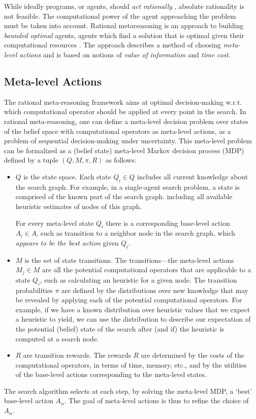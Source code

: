 While ideally programs, or agents, should {\em act rationally}
\cite{Russell.aima}, absolute rationality is not feasible. The
computational power of the agent approaching the problem must be taken
into account. Rational metareasoning \cite{Russell.right} is an
approach to building {\em bounded optimal} agents, agents which find a
solution that is optimal given their computational resources
\cite{Horvitz.reasoningabout}. The approach describes a method of
choosing {\em meta-level actions} and is based on notions of {\em
value of information} and {\em time cost}.

\subsection{Meta-level Actions}

The rational meta-reasoning framework aims at optimal
decision-making w.r.t. which computational operator should be applied
at every point in the search. In rational meta-reasoning, one can
define a meta-level decision problem over states of the belief space
with computational operators as meta-level actions, as a problem of
sequential decision-making under uncertainty. This meta-level problem
can be formalized as a (belief state) meta-level Markov decision
process (MDP) defined by a tuple $(Q, M, \pi, R)$ as follows:
\begin{itemize}
\item $Q$ is the state space. Each state $Q_i \in Q$ includes all
current knowledge about the search graph. For example, in a
single-agent search problem, a state is comprised of the known part of
the search graph. including all available heuristic estimates of nodes
of this graph. 

For every meta-level state $Q_i$ there is a
corresponding base-level action $A_i \in A$, such as transition to a
neighbor node in the search graph, which \textit{appears to be the best action}
given $Q_i$.

\item $M$ is the set of state transitions. The transitions---the
meta-level actions $M_j \in M$ are all the potential computational
operators that are applicable to a state $Q_i$, such as calculating an
heuristic for a given node. The transition probabilities $\pi$ are
defined by the distributions over new knowledge that may be revealed
by applying each of the potential computational operators.  For
example, if we have a known distribution over heuristic values that we
expect a heuristic to yield, we can use the distribution to describe
our expectation of the potential (belief) state of the search after
(and if) the heuristic is computed at a search node.

\item $R$ are transition rewards. The rewards $R$ are determined by the 
costs of the computational operators, in terms of time, memory,
etc., and by the utilities of the base-level actions corresponding to
the meta-level states.  
\end{itemize}
The search algorithm selects at each step, by solving
the meta-level MDP, a `best' base-level action $A_\alpha$.
The goal of meta-level actions is thus to refine the choice of
$A_\alpha$.

